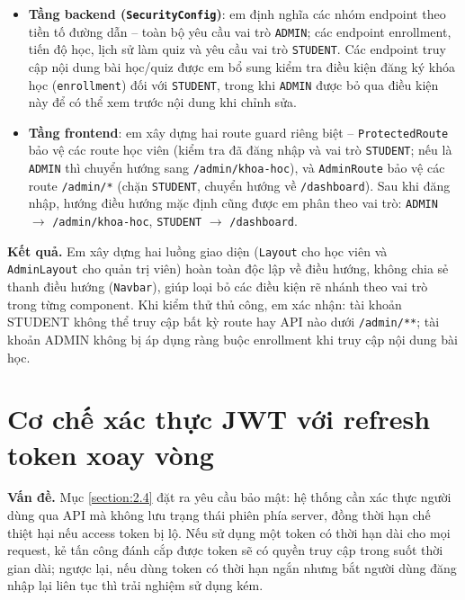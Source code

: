 \documentclass[../DoAn.tex]{subfiles}
\begin{document}
\begin{itemize}
    \item \textbf{Tầng backend (\texttt{SecurityConfig})}: em định nghĩa các nhóm endpoint theo tiền tố đường dẫn -- toàn bộ \texttt{} yêu cầu vai trò \texttt{ADMIN}; các endpoint enrollment, tiến độ học, lịch sử làm quiz và \texttt{} yêu cầu vai trò \texttt{STUDENT}. Các endpoint truy cập nội dung bài học/quiz được em bổ sung kiểm tra điều kiện đăng ký khóa học (\texttt{enrollment}) đối với \texttt{STUDENT}, trong khi \texttt{ADMIN} được bỏ qua điều kiện này để có thể xem trước nội dung khi chỉnh sửa.
    \item \textbf{Tầng frontend}: em xây dựng hai route guard riêng biệt -- \texttt{ProtectedRoute} bảo vệ các route học viên (kiểm tra đã đăng nhập và vai trò \texttt{STUDENT}; nếu là \texttt{ADMIN} thì chuyển hướng sang \texttt{/admin/khoa-hoc}), và \texttt{AdminRoute} bảo vệ các route \texttt{/admin/*} (chặn \texttt{STUDENT}, chuyển hướng về \texttt{/dashboard}). Sau khi đăng nhập, hướng điều hướng mặc định cũng được em phân theo vai trò: \texttt{ADMIN} \(\to\) \texttt{/admin/khoa-hoc}, \texttt{STUDENT} \(\to\) \texttt{/dashboard}.
\end{itemize}

\textbf{Kết quả.} Em xây dựng hai luồng giao diện (\texttt{Layout} cho học viên và \texttt{AdminLayout} cho quản trị viên) hoàn toàn độc lập về điều hướng, không chia sẻ thanh điều hướng (\texttt{Navbar}), giúp loại bỏ các điều kiện rẽ nhánh theo vai trò trong từng component. Khi kiểm thử thủ công, em xác nhận: tài khoản STUDENT không thể truy cập bất kỳ route hay API nào dưới \texttt{/admin/**}; tài khoản ADMIN không bị áp dụng ràng buộc enrollment khi truy cập nội dung bài học.

\section{Cơ chế xác thực JWT với refresh token xoay vòng}
\label{section:5.3}

\textbf{Vấn đề.} Mục \ref{section:2.4} đặt ra yêu cầu bảo mật: hệ thống cần xác thực người dùng qua API mà không lưu trạng thái phiên phía server, đồng thời hạn chế thiệt hại nếu access token bị lộ. Nếu sử dụng một token có thời hạn dài cho mọi request, kẻ tấn công đánh cắp được token sẽ có quyền truy cập trong suốt thời gian dài; ngược lại, nếu dùng token có thời hạn ngắn nhưng bắt người dùng đăng nhập lại liên tục thì trải nghiệm sử dụng kém.
\end{document}
